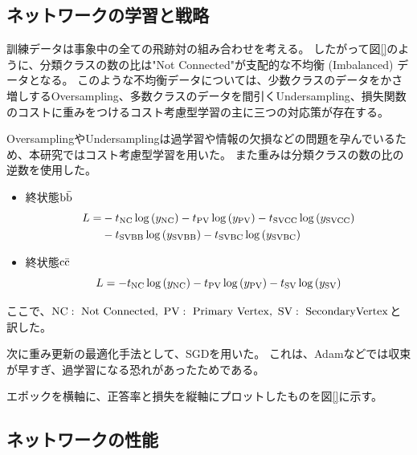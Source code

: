 \subsection{ネットワークの学習と戦略} \label{Net:PM:TrainingandStrategyofPM}

訓練データは事象中の全ての飛跡対の組み合わせを考える。
したがって図\ref{}のように、分類クラスの数の比は"Not Connected"が支配的な不均衡 (Imbalanced) データとなる。
このような不均衡データについては、少数クラスのデータをかさ増しするOversampling、多数クラスのデータを間引くUndersampling、損失関数のコストに重みをつけるコスト考慮型学習の主に三つの対応策が存在する。

OversamplingやUndersamplingは過学習や情報の欠損などの問題を孕んでいるため、本研究ではコスト考慮型学習を用いた。
また重みは分類クラスの数の比の逆数を使用した。

\begin{itemize}
 \item 終状態$\rm b\bar{b}$\\
\begin{equation}
 \begin{split}
 L = &- t_{\rm NC} \log{(y_{\rm NC})} -  t_{\rm PV} \log{(y_{\rm PV})} -  t_{\rm SVCC} \log{(y_{\rm SVCC})}\\
       &-  t_{\rm SVBB} \log{(y_{\rm SVBB})} -  t_{\rm SVBC} \log{(y_{\rm SVBC})}\\
 \end{split}
\end{equation}
 \item 終状態$\rm c\bar{c}$\\
\begin{equation}
 L = - t_{\rm NC} \log{(y_{\rm NC})} -  t_{\rm PV} \log{(y_{\rm PV})} -  t_{\rm SV} \log{(y_{\rm SV})}
\end{equation}
\end{itemize}
ここで、${\rm NC:\ Not\ Connected,\ PV:\ Primary\ Vertex,\ SV:\ Secondary Vertex}$と訳した。

次に重み更新の最適化手法として、SGDを用いた。
これは、Adamなどでは収束が早すぎ、過学習になる恐れがあったためである。

エポックを横軸に、正答率と損失を縦軸にプロットしたものを図\ref{}に示す。


\subsection{ネットワークの性能} \label{Net:PM:PerformanceofPM}

